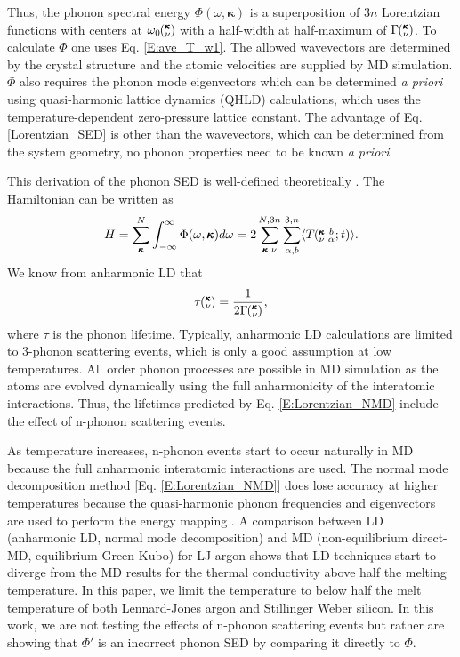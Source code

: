 \documentclass[twocolumn,10pt]{asme2e}
\newcommand{\kvbat}{\mspace{-4.0mu}\left(\mspace{-8.0mu}\begin{smallmatrix} &\pmb{\kappa} &b \\ &\nu &\alpha\end{smallmatrix}\mspace{-2.0mu};t\right)}
\newcommand{\kv}{\mspace{-4.0mu}\left(\mspace{-8.0mu}\begin{smallmatrix}&\pmb{\kappa} \\&\nu\end{smallmatrix}\mspace{-3.0mu}\right)}
\begin{document}
Thus, the phonon spectral energy $\Phi(\omega,\pmb{\kappa})$ is a superposition of $3n$ Lorentzian
functions with centers at $\omega_0\kv$ with a half-width at half-maximum of
$\Gamma\kv$. To calculate $\Phi$ one uses Eq$.$ \eqref{E:ave_T_w1}. The allowed wavevectors are determined by the crystal structure and the atomic velocities are supplied by MD simulation. $\Phi$ also requires the phonon mode eigenvectors which can be determined {\em a priori} using quasi-harmonic lattice dynamics (QHLD) calculations, which uses the temperature-dependent zero-pressure lattice constant.\cite{mcgaughey2006b} The advantage of Eq$.$ \eqref{Lorentzian_SED} is other than the wavevectors, which can be determined from the system geometry, no phonon
properties need to be known {\em a priori}.

This derivation of the phonon SED is well-defined theoretically \cite{wallace1972}. The Hamiltonian can be written as
\begin{equation}\label{E:equipartition}
H=\sum_{\pmb{\kappa}}^{N}\int_{-\infty}^{\infty}\Phi(\omega,\pmb{\kappa})d\omega=2\sum_{\pmb{\kappa},\nu}^{N,3n}\sum_{\alpha,b}^{3,n}\langle T\kvbat\rangle.
\end{equation}
We know from anharmonic LD that \cite{maradudin1962,ladd1986}
\begin{equation}\label{E:lifetime}
\tau\kv=\frac{1}{2\Gamma\kv},
\end{equation}
where $\tau$ is the phonon lifetime. Typically, anharmonic LD calculations are limited to 3-phonon scattering events, which is only a good assumption at low temperatures.\cite{turney2009a,esfarjani2011} All order phonon processes are possible in MD simulation as the atoms are evolved dynamically using the full anharmonicity of the interatomic interactions.\cite{mcgaughey2004c,landry2008,schelling2002} Thus, the lifetimes predicted by Eq$.$ \eqref{E:Lorentzian_NMD} include the effect of n-phonon scattering events.

As temperature increases, n-phonon events start to occur naturally in MD because the full anharmonic interatomic interactions are used. The normal mode decomposition method [Eq$.$ \eqref{E:Lorentzian_NMD}] does lose accuracy
at higher temperatures because the quasi-harmonic phonon frequencies and
eigenvectors are used to perform the energy mapping
\cite{turney2009a}. A comparison between LD (anharmonic LD, normal mode decomposition) and MD (non-equilibrium direct-MD, equilibrium Green-Kubo) for LJ argon shows that LD techniques start to diverge from the MD results for the thermal conductivity above half the melting temperature.  In this paper, we limit the temperature to below half the melt temperature of both Lennard-Jones argon and Stillinger Weber silicon. In this work, we are not testing the effects of n-phonon scattering events but rather are showing that $\Phi'$ is an incorrect phonon SED by comparing it directly to $\Phi$.
\end{document}
